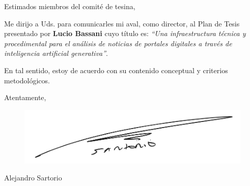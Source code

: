 \documentclass[11pt]{letter}
\date{Rosario, 9 de octubre de 2023}
\begin{document}
\begin{letter}{}



\opening{Estimados miembros del comité de tesina,}



\hspace{5 cm} Me dirijo a Uds. para comunicarles mi aval, como director,  al Plan de Tesis presentado por \textbf{Lucio Bassani} cuyo título es: \textit{“Una infraestructura técnica y procedimental para el análisis de noticias de portales digitales a través de inteligencia artificial generativa”}.


\hspace{5cm} En tal sentido, estoy de acuerdo con su contenido conceptual y criterios metodológicos.

\closing{Atentamente,}
\begin{figure}
    \centering
    \includegraphics[width=0.5\linewidth]{Firma.jpeg}
    \label{fig:enter-label}
\end{figure}

\hspace{1cm}  Alejandro Sartorio

\end{letter}
\end{document}
